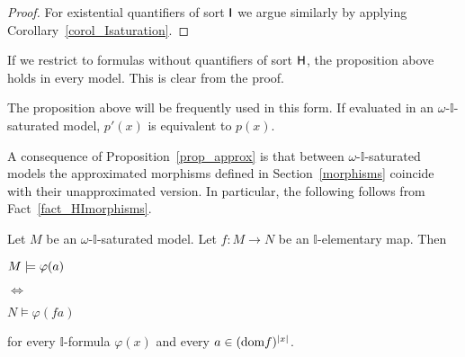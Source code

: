 \documentclass[10pt,oneside]{amsproc}
\begin{document}
\begin{proof}
For existential quantifiers of sort ${\sf I}$ we argue similarly by applying Corollary~\ref{corol_Isaturation}.
%
%
%
%
%
\end{proof}

\begin{remark}
  If we restrict to formulas without quantifiers of sort ${\sf H}$, the proposition above holds in every model.
  This is clear from the proof.
\end{remark}

\def\ceq#1#2#3{\parbox[t]{20ex}{$\displaystyle #1$}\parbox{5ex}{\hfil $#2$}{$\displaystyle #3$}}

\begin{remark}\label{remk_p'p}
  The proposition above will be frequently used in this form.
  If evaluated in an $\omega$-$\mathds{I}$-saturated model, $p'(x)$ is equivalent to $p(x)$.
\end{remark}

A consequence of Proposition~\ref{prop_approx} is that between $\omega$-$\mathds{I}$-saturated models the approximated morphisms defined in Section~\ref{morphisms} coincide with their unapproximated version.
In particular, the following follows from Fact~\ref{fact_HImorphisms}.

\begin{corollary}\label{corol_omega_sat}
  Let $M$ be an $\omega$-$\mathds{I}$-saturated model.
  Let $f:M\to N$ be an $\mathds{I}$-elementary map.
  Then

  \ceq{\hfill M\models\varphi(a)}{\Leftrightarrow}{N\models\varphi(fa)}

  for every $\mathds{I}$-formula $\varphi(x)$ and every $a\in({\rm dom }f)^{|x|}$.
\end{corollary}  



\end{document}
